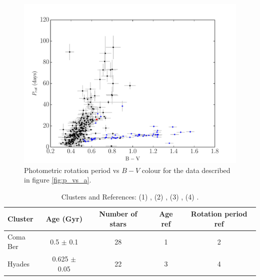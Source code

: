 \documentclass[useAMS, usenatbib]{mn2e}
\begin{document}
\begin{figure}
\begin{center}
\includegraphics[width=6in, clip=true, trim=0 0 0.5in 0]{p_vs_bv_paper2.pdf}
\caption{Photometric rotation period vs $B-V$ colour for the data described in
	figure \ref{fig:p_vs_a}.
\label{fig:3d}}
\end{center}
\end{figure}


\begin{table}
\caption{Clusters and References: (1) \citet{Dobbie2009},
	(2) \citet{CollierCameron2009}, (3) \citet{Perryman1998},
	(4) \citet{Radick1987}. \label{tab:clust}}
\begin{tabular}{lcccc}
\hline\hline
Cluster & Age (Gyr) & Number of stars & Age ref & Rotation period ref \\
\hline
Coma Ber & 0.5 $\pm$ 0.1 & 28 & 1 & 2 \\
Hyades & 0.625 $\pm$ 0.05 & 22 & 3 & 4 \\
\hline
\end{tabular}
\end{table}
\end{document}
